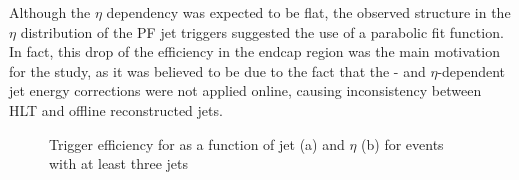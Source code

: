 Although the $\eta$ dependency was expected to be flat, the observed structure in the $\eta$ distribution of the PF jet
triggers suggested the use of a parabolic fit function. In fact, this drop of the efficiency in the endcap region was
the main motivation for the study, as it was believed to be due to the fact that the \pt- and $\eta$-dependent jet
energy corrections were not applied online, causing inconsistency between HLT and offline reconstructed jets.

\begin{figure}[hbtp]
    \centering
{}
\hfill
{}
\caption[Trigger efficiency for \HLTThreeCentralPFJet as a function of jet \pt and $\eta$]{Trigger efficiency for
\HLTThreeCentralPFJet as a function of jet \pt (a) and $\eta$ (b) for events with at least three jets}
\label{fig:top_hlt_pt_eta_3jets} 
 \end{figure}

